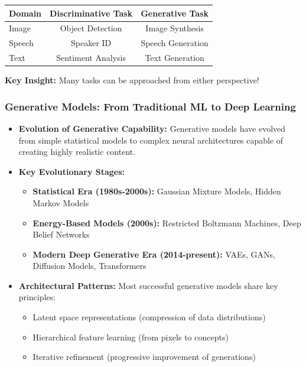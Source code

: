 \documentclass[5pt,aspectratio=169]{beamer}
\begin{document}
\begin{frame}
\begin{center}
\begin{tabular}{|l|c|c|}
\hline
\textbf{Domain} & \textbf{Discriminative Task} & \textbf{Generative Task} \\
\hline
Image & Object Detection & Image Synthesis \\
Speech & Speaker ID & Speech Generation \\
Text & Sentiment Analysis & Text Generation \\
\hline
\end{tabular}
\end{center}

\textbf{Key Insight:} Many tasks can be approached from either perspective!
\end{frame}

\begin{frame}
\frametitle{Generative Models: From Traditional ML to Deep Learning}

\begin{itemize}
\item \textbf{Evolution of Generative Capability:} Generative models have evolved from simple statistical models to complex neural architectures capable of creating highly realistic content.

\item \textbf{Key Evolutionary Stages:}
  \begin{itemize}
  \item \textbf{Statistical Era (1980s-2000s):} Gaussian Mixture Models, Hidden Markov Models
  \item \textbf{Energy-Based Models (2000s):} Restricted Boltzmann Machines, Deep Belief Networks
  \item \textbf{Modern Deep Generative Era (2014-present):} VAEs, GANs, Diffusion Models, Transformers
  \end{itemize}

\item \textbf{Architectural Patterns:} Most successful generative models share key principles:
  \begin{itemize}
  \item Latent space representations (compression of data distributions)
  \item Hierarchical feature learning (from pixels to concepts)
  \item Iterative refinement (progressive improvement of generations)
  \end{itemize}
\end{itemize}
\end{frame}
\end{document}

